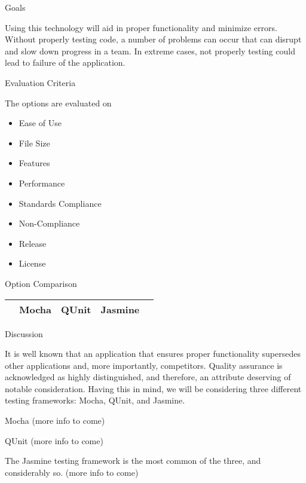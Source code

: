 \documentclass[letterpaper, 10pt, draftclsnofoot, compsoc, onecolumn]{IEEEtran}
\begin{document}
{\medskip
{\noindent Goals \par}
{\noindent Using this technology will aid in proper functionality and minimize errors. Without properly testing code, a number of problems can occur that can disrupt and slow down progress in a team. In extreme cases, not properly testing could lead to failure of the application. \par}

\medskip
\newpage
{\noindent Evaluation Criteria \par}
{\noindent The options are evaluated on 

\begin{itemize}
\item Ease of Use
\item File Size
\item Features
\item Performance
\item Standards Compliance
\item Non-Compliance
\item Release 
\item License
\end{itemize}

 \par}


\newpage
{\noindent Option Comparison \par}
\tablehead{}
\begin{supertabular}{|p{2cm}|p{2.5cm}|p{2.5cm}|p{2.5cm}|p{2.5cm}|}
\hline
& Mocha & QUnit & Jasmine\\ \hline
\end{supertabular}

\newpage
{\noindent Discussion \par}
{\noindent It is well known that an application that ensures proper functionality supersedes other applications and, more importantly, competitors. Quality assurance is acknowledged as highly distinguished, and therefore, an attribute deserving of notable consideration. Having this in mind, we will be considering three different testing frameworks: Mocha, QUnit, and Jasmine. \par}
{\noindent Mocha (more info to come) \par}
{\noindent QUnit (more info to come) \par}
{\noindent The Jasmine testing framework is the most common of the three, and considerably so. (more info to come) \par}

}
\end{document}
